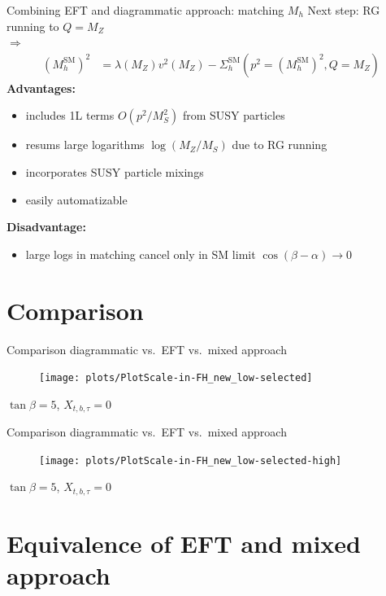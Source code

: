 \documentclass[hyperref={pdfpagelabels=false},ngerman]{beamer}
\renewcommand{\emph}{\textbf}
\newcommand{\SM}{\ensuremath{\text{SM}}}
\begin{document}
\begin{frame}{Combining EFT and diagrammatic approach: matching $M_h$}
  Next step: RG running to $Q = M_Z$\\
  $\Rightarrow$
  \begin{align*}
    (M_h^{\SM})^2 &= \lambda(M_Z) v^2(M_Z) - \Sigma^{\SM}_h(p^2 = (M_h^{\SM})^2,Q = M_Z)
  \end{align*}
  \emph{Advantages:}
  \begin{itemize}
  \item includes 1L terms $O(p^2/M_S^2)$ from SUSY particles
  \item resums large logarithms $\log(M_Z/M_S)$ due to RG running
  \item incorporates SUSY particle mixings
  \item easily automatizable
  \end{itemize}
  \emph{Disadvantage:}
  \begin{itemize}
  \item large logs in matching cancel only in SM limit $\cos(\beta - \alpha) \rightarrow 0$
  \end{itemize}
\end{frame}


\section{Comparison}

\begin{frame}{Comparison diagrammatic vs.\ EFT vs.\ mixed approach}
  \begin{figure}
    \centering
    \texttt{[image: plots/PlotScale-in-FH\_new\_low-selected]}
  \end{figure}
  $\tan\beta = 5$, $X_{t,b,\tau} = 0$
\end{frame}

\begin{frame}{Comparison diagrammatic vs.\ EFT vs.\ mixed approach}
  \begin{figure}
    \centering
    \texttt{[image: plots/PlotScale-in-FH\_new\_low-selected-high]}
  \end{figure}
  $\tan\beta = 5$, $X_{t,b,\tau} = 0$
\end{frame}


\section{Equivalence of EFT and mixed approach}
\end{document}
